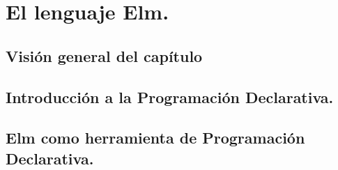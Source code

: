 \documentclass[fleqn, 11pt, a4paper]{book}
\newcommand\blankpage{%
  \null
  \thispagestyle{empty}%
  \newpage}
\begin{document}
\setlength{\parskip}{0.5cm}

\renewcommand{\listtablename}{Índice de tablas}
\renewcommand{\tablename}{Tabla}

\renewcommand{\lstlistlistingname}{Índice de fragmentos de código}
\renewcommand{\lstlistingname}{Código}
\renewcommand{\mtctitle}{}

\dominitoc



\blankpage



\blankpage




\blankpage

\setcounter{page}{1}%

\renewcommand{\contentsname}{Índice de contenidos}

\pagestyle{empty}
\tableofcontents




\newpage

\pagestyle{fancy}




\chapter{El lenguaje Elm.}

\minitoc

\newpage

\section{Visión general del capítulo}
\section{Introducción a la Programación Declarativa.}
\section{Elm como herramienta de Programación Declarativa.}
\end{document}
